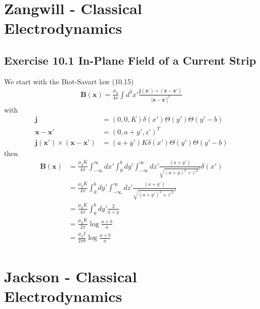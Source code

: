 \documentclass[10pt,a4paper]{book}
\theoremstyle{definition}
\begin{document}
\section{{\sc Zangwill} - Classical Electrodynamics}
\subsection{Exercise 10.1 In-Plane Field of a Current Strip}
We start with the Biot-Savart law (10.15)
\begin{align}
\mathbf{B}(\mathbf{x})=\frac{\mu_0}{4\pi}\int d^3x'\frac{\mathbf{j}(\mathbf{x}')\times(\mathbf{x}-\mathbf{x}')}{|\mathbf{x}-\mathbf{x}'|^3}
\end{align}
with
\begin{align}
\mathbf{j}&=(0,0,K)\delta(x')\Theta(y')\Theta(y'-b)\\
\mathbf{x}-\mathbf{x}'&=(0,a+y',z')^T\\
\mathbf{j}(\mathbf{x}')\times(\mathbf{x}-\mathbf{x}')&=(a+y')K\delta(x')\Theta(y')\Theta(y'-b)
\end{align}
then
\begin{align}
\mathbf{B}(\mathbf{x})
&=\frac{\mu_0K}{4\pi}\int_{-\infty}^\infty dx'\int_0^b dy'\int_{-\infty}^\infty dz'\frac{(a+y')}{\sqrt{(a+y)^2+z'^2}^3}\delta(x')\\
&=\frac{\mu_0K}{4\pi}\int_0^b dy'\int_{-\infty}^\infty dz'\frac{(a+y')}{\sqrt{(a+y')^2+z'^2}^3}\\
&=\frac{\mu_0K}{4\pi}\int_0^b dy'\frac{2}{a+y}\\
&=\frac{\mu_0K}{2\pi}\log\frac{a+b}{a}\\
&=\frac{\mu_0I}{2\pi b}\log\frac{a+b}{a}\\
\end{align}

\section{{\sc Jackson} - Classical Electrodynamics}
\end{document}

